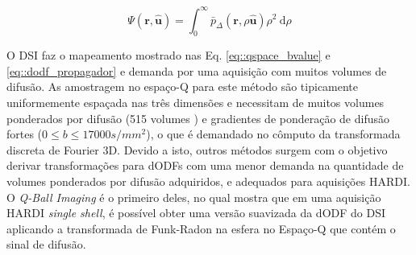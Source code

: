 \documentclass[
    12pt,                %
    oneside,            %
    a4paper,            %
    english,            %
    french,                %
    spanish,            %
    brazil                %
    ]{abntex2}
\begin{document}
\begin{equation}
\label{eq::dodf_propagador}
\Psi(\mathbf{\mathbf{r},\hat{u}})=\int_{0}^{\infty} \bar{p}_{\Delta}(\mathbf{r}, \rho  \mathbf{\hat{u}}) \rho^2 \mathrm{~d}\rho
\end{equation}


O DSI \cite{wedeen2005} faz o mapeamento mostrado nas Eq. \ref{eq::qspace_bvalue} e \ref{eq::dodf_propagador} e demanda por uma aquisição com muitos volumes de difusão. As amostragem no espaço-Q para este método são tipicamente uniformemente espaçada nas três dimensões e necessitam de muitos volumes ponderados por difusão (515 volumes \cite{wedeen2005}) e gradientes de ponderação de difusão fortes ($0 \leq b \leq 17000 s/mm^2$), o que é demandado no cômputo da transformada discreta de Fourier 3D. Devido a isto, outros métodos surgem com o objetivo derivar transformações para dODFs com uma menor demanda na quantidade de volumes ponderados por difusão adquiridos, e adequados para aquisições HARDI. O \textit{Q-Ball Imaging} é o primeiro deles, no qual  mostra que em uma aquisição HARDI \textit{single shell}, é possível obter uma versão suavizada da dODF do DSI aplicando a transformada de Funk-Radon na esfera no Espaço-Q que contém o sinal de difusão.

\end{document}
